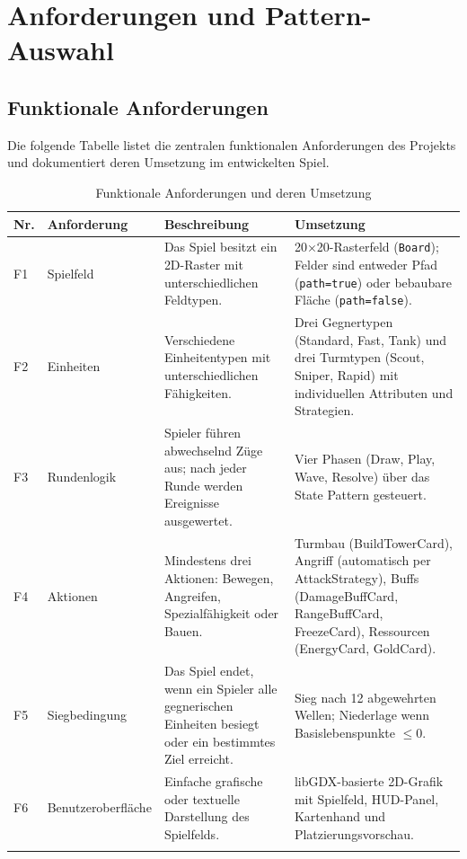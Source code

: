 \section{Anforderungen und Pattern-Auswahl}

\subsection{Funktionale Anforderungen}

Die folgende Tabelle listet die zentralen funktionalen Anforderungen des Projekts
und dokumentiert deren Umsetzung im entwickelten Spiel.

\begin{longtable}{p{1cm} p{3cm} p{5cm} p{4.5cm}}
    \toprule
    \textbf{Nr.} & \textbf{Anforderung} & \textbf{Beschreibung} & \textbf{Umsetzung} \\
    \midrule
    \endhead
    F1 & Spielfeld &
        Das Spiel besitzt ein 2D-Raster mit unterschied\-lichen Feldtypen. &
        20×20-Rasterfeld (\texttt{Board}); Felder sind entweder Pfad (\texttt{path=true})
        oder bebaubare Fläche (\texttt{path=false}). \\
    \addlinespace
    F2 & Einheiten &
        Verschiedene Einheitentypen mit unterschiedlichen Fähigkeiten. &
        Drei Gegnertypen (Standard, Fast, Tank) und drei Turmtypen (Scout, Sniper, Rapid)
        mit individuellen Attributen und Strategien. \\
    \addlinespace
    F3 & Rundenlogik &
        Spieler führen abwechselnd Züge aus; nach jeder Runde werden Ereignisse
        ausgewertet. &
        Vier Phasen (Draw, Play, Wave, Resolve) über das State Pattern gesteuert. \\
    \addlinespace
    F4 & Aktionen &
        Mindestens drei Aktionen: Bewegen, Angreifen, Spezialfähigkeit oder Bauen. &
        Turmbau (BuildTowerCard), Angriff (automatisch per AttackStrategy), Buffs
        (DamageBuffCard, RangeBuffCard, FreezeCard), Ressourcen (EnergyCard, GoldCard). \\
    \addlinespace
    F5 & Siegbedingung &
        Das Spiel endet, wenn ein Spieler alle gegnerischen Einheiten besiegt oder
        ein bestimmtes Ziel erreicht. &
        Sieg nach 12 abgewehrten Wellen; Niederlage wenn Basislebenspunkte $\leq 0$. \\
    \addlinespace
    F6 & Benutzeroberfläche &
        Einfache grafische oder textuelle Darstellung des Spielfelds. &
        libGDX-basierte 2D-Grafik mit Spielfeld, HUD-Panel, Kartenhand und
        Platzierungsvorschau. \\
    \bottomrule
    \caption{Funktionale Anforderungen und deren Umsetzung}
    \label{tab:fa}
\end{longtable}

